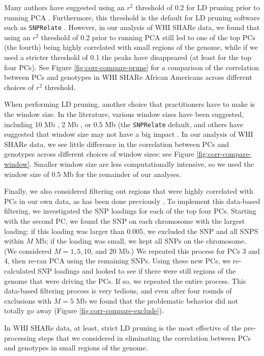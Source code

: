 \documentclass[12pt]{article}
\newcommand{\edit}[1]{{\color{red}{#1}}}
\begin{document}
Many authors have suggested using an $r^2$ threshold of 0.2 for LD pruning prior to running PCA \edit{\citep{142, 68, 164, 136, 135, 131, 66, 129}}.
Furthermore, this threshold is the default for LD pruning software such as \texttt{SNPRelate} \citep{snprelate}.
However, in our analysis of WHI SHARe data, we found that using an $r^2$ threshold of 0.2 prior to running PCA still led to one of the top PCs (the fourth) being highly correlated with small regions of the genome, while if we used a stricter threshold of 0.1 the peaks have disappeared (at least for the top four PCs).
See Figure \ref{fig:corr-compare-prune} for a comparison of the correlation between PCs and genotypes in WHI SHARe African Americans across different choices of $r^2$ threshold.

When performing LD pruning, another choice that practitioners have to make is the window size. 
In the literature, various window sizes have been suggested, including 10 Mb \edit{\citep{89}}, 2 Mb \edit{\citep{68}}, or 0.5 Mb (the \texttt{SNPRelate} default, and others have suggested that window size may not have a big impact \edit{\citep{136}}.
In our analysis of WHI SHARe data, we see little difference in the correlation between PCs and genotypes across different choices of window sizes: see Figure \ref{fig:corr-compare-window}.
Smaller window size are less computationally intensive, so we used the window size of 0.5 Mb for the remainder of our analyses.

Finally, we also considered filtering out regions that were highly correlated with PCs in our own data, as has been done previously \edit{\citep{66, 142}}.
To implement this data-based filtering, we investigated the SNP loadings for each of the top four PCs. 
Starting with the second PC, we found the SNP on each chromosome with the largest loading: if this loading was larger than 0.005, we excluded the SNP and all SNPS within $M$ Mb; if the loading was small, we kept all SNPs on the chromosome.
(We considered $M = 1, 5, 10$, and $20$ Mb.) 
We repeated this process for PCs 3 and 4, then re-ran PCA using the remaining SNPs.
Using these new PCs, we re-calculated SNP loadings and looked to see if there were still regions of the genome that were driving the PCs.
If so, we repeated the entire process.
This data-based filtering process is very tedious, and even after four rounds of exclusions with $M = 5$ Mb we found that the problematic behavior did not totally go away (Figure \ref{fig:corr-compare-exclude}).

In WHI SHARe data, at least, strict LD pruning is the most effective of the pre-processing steps that we considered in eliminating the correlation between PCs and genotypes in small regions of the genome.
\end{document}

